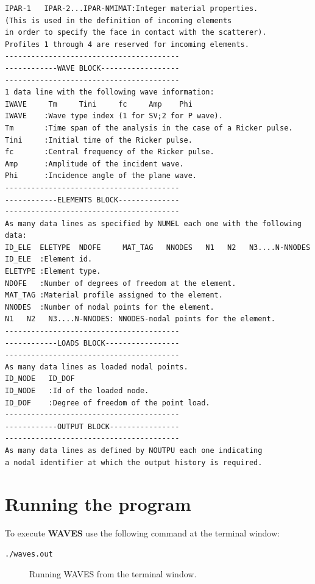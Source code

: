\documentclass[12pt,letterpaper]{article}
\begin{document}
\begin{verbatim}
IPAR-1   IPAR-2...IPAR-NMIMAT:Integer material properties.
(This is used in the definition of incoming elements
in order to specify the face in contact with the scatterer).
Profiles 1 through 4 are reserved for incoming elements.      
----------------------------------------
------------WAVE BLOCK------------------
----------------------------------------
1 data line with the following wave information:
IWAVE     Tm     Tini     fc     Amp    Phi
IWAVE    :Wave type index (1 for SV;2 for P wave).    
Tm       :Time span of the analysis in the case of a Ricker pulse.     
Tini     :Initial time of the Ricker pulse.     
fc       :Central frequency of the Ricker pulse.     
Amp      :Amplitude of the incident wave.    
Phi      :Incidence angle of the plane wave.
----------------------------------------
------------ELEMENTS BLOCK--------------
----------------------------------------
As many data lines as specified by NUMEL each one with the following data:
ID_ELE  ELETYPE  NDOFE     MAT_TAG   NNODES   N1   N2   N3....N-NNODES
ID_ELE  :Element id.
ELETYPE :Element type.
NDOFE   :Number of degrees of freedom at the element.
MAT_TAG :Material profile assigned to the element.
NNODES  :Number of nodal points for the element.
N1   N2   N3....N-NNODES: NNODES-nodal points for the element.
----------------------------------------
------------LOADS BLOCK-----------------
----------------------------------------
As many data lines as loaded nodal points.
ID_NODE   ID_DOF
ID_NODE   :Id of the loaded node.
ID_DOF    :Degree of freedom of the point load.
----------------------------------------
------------OUTPUT BLOCK----------------
----------------------------------------
As many data lines as defined by NOUTPU each one indicating
a nodal identifier at which the output history is required.
\end{verbatim}


\section{Running the program}
To execute {\bf WAVES} use the following command at the terminal window:

\begin{verbatim}
./waves.out
\end{verbatim}
 
 
\begin{figure}[H]
\centering
{}
\caption{Running WAVES from the terminal window.}
\label{fig: terminal}
\end{figure} 
 
\end{document}
